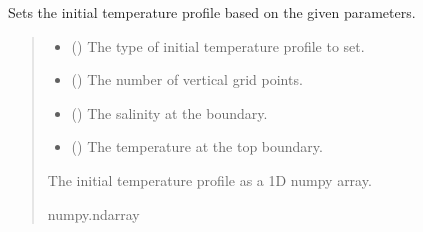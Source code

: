 \documentclass[a4paper,11pt,english,openany]{sphinxmanual}
\begin{document}
\begin{fulllineitems}
\label{\detokenize{api/spyice.preprocess.initial_boundary_conditions:src.spyice.preprocess.initial_boundary_conditions.set_inital_temperature}}
\pysigstartsignatures
\pysiglinewithargsret
{}
{\sphinxparamcomma {}\sphinxparamcomma {}\sphinxparamcomma {}}
{}
\pysigstopsignatures
\sphinxAtStartPar
Sets the initial temperature profile based on the given parameters.
\begin{quote}\begin{description}
\begin{itemize}
\item {} 
\sphinxAtStartPar
{} () \textendash{} The type of initial temperature profile to set.

\item {} 
\sphinxAtStartPar
{} () \textendash{} The number of vertical grid points.

\item {} 
\sphinxAtStartPar
{} () \textendash{} The salinity at the boundary.

\item {} 
\sphinxAtStartPar
{} () \textendash{} The temperature at the top boundary.

\end{itemize}

\sphinxAtStartPar
The initial temperature profile as a 1D numpy array.

\sphinxAtStartPar
numpy.ndarray

\sphinxAtStartPar
{} \textendash{} 

\end{description}\end{quote}

\end{fulllineitems}
\end{document}
